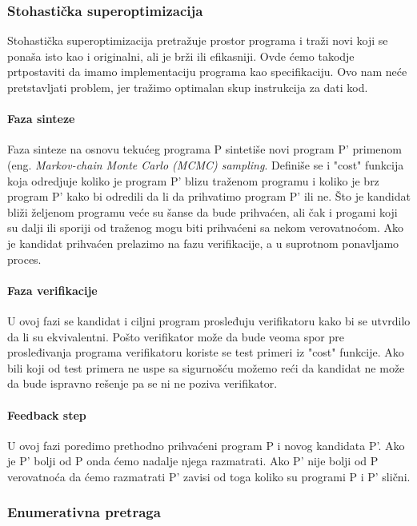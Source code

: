 \subsubsection{Stohastička superoptimizacija}
\label{subsec:stohastickaSuperoptimizacija}

Stohastička superoptimizacija pretražuje prostor programa i traži novi koji se ponaša isto kao i originalni, ali je brži ili efikasniji. Ovde ćemo takodje prtpostaviti da imamo implementaciju programa kao specifikaciju. Ovo nam neće pretstavljati problem, jer tražimo optimalan skup instrukcija za dati kod.

\paragraph{Faza sinteze}
Faza sinteze na osnovu tekućeg programa P sintetiše novi program P' primenom (eng. \emph{Markov-chain Monte Carlo (MCMC) sampling}. Definiše se i "cost" funkcija koja odredjuje koliko je program P' blizu traženom programu i koliko je brz program P' kako bi odredili da li da prihvatimo program P' ili ne. Što je kandidat bliži željenom programu veće su šanse da bude prihvaćen, ali čak i progami koji su dalji ili sporiji od traženog mogu biti prihvaćeni sa nekom verovatnoćom. Ako je kandidat prihvaćen prelazimo na fazu verifikacije, a u suprotnom ponavljamo proces.

\paragraph{Faza verifikacije}

U ovoj fazi se kandidat i ciljni program prosleđuju verifikatoru kako bi se utvrdilo da li su ekvivalentni. Pošto verifikator može da bude veoma spor pre prosleđivanja programa verifikatoru koriste se test primeri iz "cost" funkcije. Ako bili koji od test primera ne uspe sa sigurnošću možemo reći da kandidat ne može da bude ispravno rešenje pa se ni ne poziva verifikator.

\paragraph{Feedback step}

U ovoj fazi poredimo prethodno prihvaćeni program P i novog kandidata P'. Ako je P' bolji od P onda ćemo nadalje njega razmatrati. Ako P' nije bolji od P verovatnoća da ćemo razmatrati P' zavisi od toga koliko su programi P i P' slični.

\subsubsection{Enumerativna pretraga}
\label{subsec:enumerativnaPretraga}

